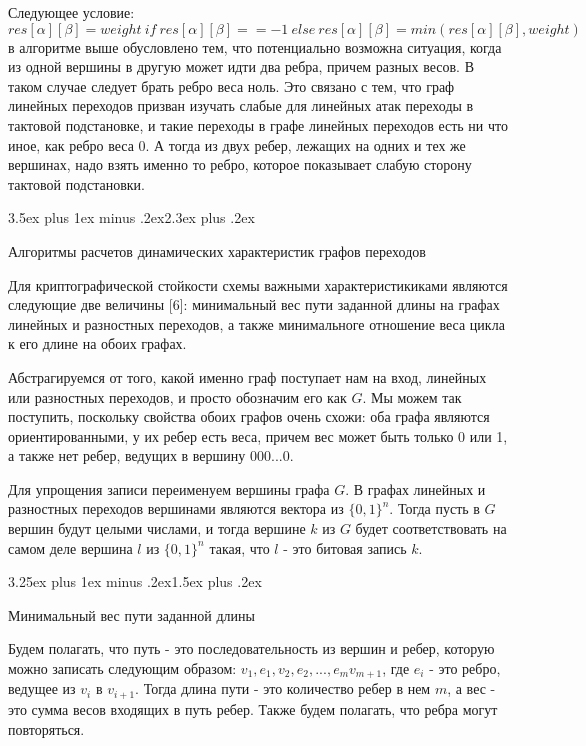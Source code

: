 \documentclass[a4paper,12pt]{report}
\makeatletter
\theoremstyle{plain} %
\theoremstyle{definition}
\theoremstyle{remark}
\renewcommand{\section}{\@startsection{section}{1}{18pt}%
{3.5ex plus 1ex minus .2ex}{2.3ex plus .2ex}%
{\normalfont\Large\bfseries\raggedright}}%
\renewcommand{\subsection}{\@startsection{subsection}{2}{18pt}%
{3.25ex plus 1ex minus .2ex}{1.5ex plus .2ex}%
{\normalfont\large\bfseries\raggedright}}%
\makeatother
\begin{document}
\begin{large}
Следующее условие: $$res[\alpha][\beta] = weight ~if~ res[\alpha][\beta] == -1 ~else~res[\alpha][\beta]=min(res[\alpha][\beta], weight)$$ в алгоритме выше обусловлено тем, что потенциально возможна ситуация, когда из одной вершины в другую может идти два ребра, причем разных весов. В таком случае следует брать ребро веса ноль. Это связано с тем, что граф линейных переходов призван изучать слабые для линейных атак переходы в тактовой подстановке, и такие переходы в графе линейных переходов есть ни что иное, как ребро веса 0. А тогда из двух ребер, лежащих на одних и тех же вершинах, надо взять именно то ребро, которое показывает слабую сторону тактовой подстановки.

\section{Алгоритмы расчетов динамических характеристик графов переходов}

Для криптографической стойкости схемы важными характеристикиками являются следующие две величины [6]: минимальный вес пути заданной длины на графах линейных и разностных переходов, а также минимальноге отношение веса цикла к его длине на обоих графах.

Абстрагируемся от того, какой именно граф поступает нам на вход, линейных или разностных переходов, и просто обозначим его как $G$. Мы можем так поступить, поскольку свойства обоих графов очень схожи: оба графа являются ориентированными, у их ребер есть веса, причем вес может быть только 0 или 1, а также нет ребер, ведущих в вершину 000...0.

Для упрощения записи переименуем вершины графа $G$. В графах линейных и разностных переходов вершинами являются вектора из $\{0, 1\}^n$. Тогда пусть в $G$ вершин будут целыми числами, и тогда вершине $k$ из $G$ будет соответствовать на самом деле вершина $l$ из $\{0, 1\}^n$ такая, что $l$ - это битовая запись $k$.

\subsection{Минимальный вес пути заданной длины}

Будем полагать, что путь - это последовательность из вершин и ребер, которую можно записать следующим образом: $v_1, e_1, v_2, e_2, ..., e_mv_{m+1}$, где $e_i$ - это ребро, ведущее из $v_i$ в $v_{i+1}$. Тогда длина пути - это количество ребер в нем $m$, а вес - это сумма весов входящих в путь ребер. Также будем полагать, что ребра могут повторяться.


\end{large}
\end{document}
